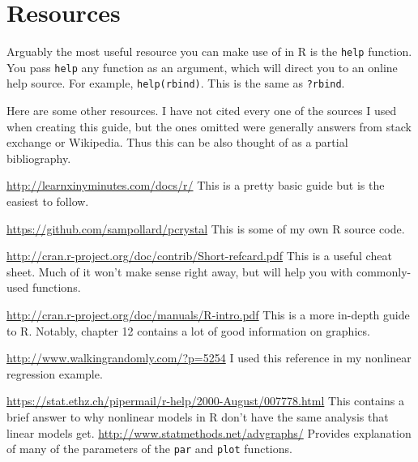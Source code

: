 \documentclass[12pt]{article}
\begin{document}
\vfill
\section{Resources}
Arguably the most useful resource you can make use of in R is the \verb|help| function. You pass \verb|help| any function as an argument, which will direct you to an online help source. For example, \verb|help(rbind)|. This is the same as \verb|?rbind|.

Here are some other resources. I have not cited every one of the sources I used when creating this guide, but the ones omitted were generally answers from stack exchange or Wikipedia. Thus this can be also thought of as a partial bibliography.
\begingroup
\renewcommand{\section}[2]{}%
\begin{thebibliography}{}
		\url{http://learnxinyminutes.com/docs/r/}
		This is a pretty basic guide but is the easiest to follow.
		
		\url{https://github.com/sampollard/pcrystal}
		This is some of my own R source code.
		
		\url{http://cran.r-project.org/doc/contrib/Short-refcard.pdf}
		This is a useful cheat sheet. Much of it won't make sense right away, but will help you with commonly-used functions.
		
		\url{http://cran.r-project.org/doc/manuals/R-intro.pdf}
		This is a more in-depth guide to R. Notably, chapter 12 contains a lot of good information on graphics.
	
		\url{http://www.walkingrandomly.com/?p=5254}
		I used this reference in my nonlinear regression example.
		
		\url{https://stat.ethz.ch/pipermail/r-help/2000-August/007778.html}
		This contains a brief answer to why nonlinear models in R don't have the same analysis that linear models get.
		\url{http://www.statmethods.net/advgraphs/} Provides explanation of many of the parameters of the \verb|par| and \verb|plot| functions.
\end{thebibliography}
\endgroup
\end{document}

